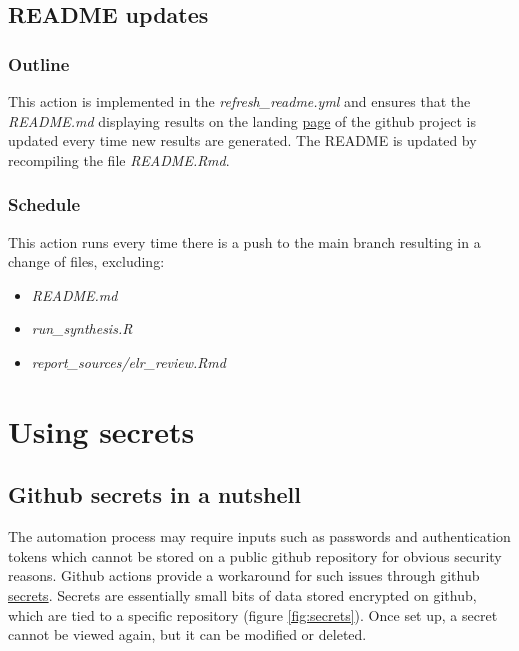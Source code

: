 \documentclass[]{book}
\providecommand{\tightlist}{%
  \setlength{\itemsep}{0pt}\setlength{\parskip}{0pt}}
\begin{document}
\hypertarget{readme-updates}{%
\subsection{README updates}\label{readme-updates}}

\hypertarget{outline-3}{%
\subsubsection{Outline}\label{outline-3}}

This action is implemented in the \emph{refresh\_readme.yml} and ensures that the
\emph{README.md} displaying results on the landing
\href{https://github.com/whocov/trend_analysis_public}{page} of the github project is
updated every time new results are generated. The README is updated by
recompiling the file \emph{README.Rmd}.

\hypertarget{schedule-3}{%
\subsubsection{Schedule}\label{schedule-3}}

This action runs every time there is a push to the main branch resulting in a
change of files, excluding:

\begin{itemize}
\tightlist
\item
  \emph{README.md}
\item
  \emph{run\_synthesis.R}
\item
  \emph{report\_sources/elr\_review.Rmd}
\end{itemize}

\hypertarget{using-secrets}{%
\section{Using secrets}\label{using-secrets}}

\hypertarget{github-secrets-in-a-nutshell}{%
\subsection{Github secrets in a nutshell}\label{github-secrets-in-a-nutshell}}

The automation process may require inputs such as passwords and authentication
tokens which cannot be stored on a public github repository for obvious security
reasons. Github actions provide a workaround for such issues through github
\href{https://docs.github.com/en/actions/reference/encrypted-secrets}{secrets}. Secrets
are essentially small bits of data stored encrypted on github, which are tied to
a specific repository (figure \ref{fig:secrets}). Once set up, a secret cannot
be viewed again, but it can be modified or deleted.
\end{document}
